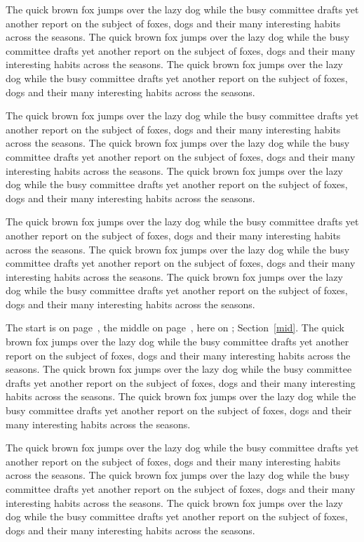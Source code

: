 \documentclass{article}
\begin{document}
The quick brown fox jumps over the lazy dog while the busy committee drafts yet another report on the subject of foxes, dogs and their many interesting habits across the seasons. The quick brown fox jumps over the lazy dog while the busy committee drafts yet another report on the subject of foxes, dogs and their many interesting habits across the seasons. The quick brown fox jumps over the lazy dog while the busy committee drafts yet another report on the subject of foxes, dogs and their many interesting habits across the seasons. 

The quick brown fox jumps over the lazy dog while the busy committee drafts yet another report on the subject of foxes, dogs and their many interesting habits across the seasons. The quick brown fox jumps over the lazy dog while the busy committee drafts yet another report on the subject of foxes, dogs and their many interesting habits across the seasons. The quick brown fox jumps over the lazy dog while the busy committee drafts yet another report on the subject of foxes, dogs and their many interesting habits across the seasons. 

The quick brown fox jumps over the lazy dog while the busy committee drafts yet another report on the subject of foxes, dogs and their many interesting habits across the seasons. The quick brown fox jumps over the lazy dog while the busy committee drafts yet another report on the subject of foxes, dogs and their many interesting habits across the seasons. The quick brown fox jumps over the lazy dog while the busy committee drafts yet another report on the subject of foxes, dogs and their many interesting habits across the seasons. 

The start is on page~\pageref{start}, the middle on page~\pageref{mid}, here on \pageref{here}; Section~\ref{mid}.\label{end}
The quick brown fox jumps over the lazy dog while the busy committee drafts yet another report on the subject of foxes, dogs and their many interesting habits across the seasons. The quick brown fox jumps over the lazy dog while the busy committee drafts yet another report on the subject of foxes, dogs and their many interesting habits across the seasons. The quick brown fox jumps over the lazy dog while the busy committee drafts yet another report on the subject of foxes, dogs and their many interesting habits across the seasons. 

The quick brown fox jumps over the lazy dog while the busy committee drafts yet another report on the subject of foxes, dogs and their many interesting habits across the seasons. The quick brown fox jumps over the lazy dog while the busy committee drafts yet another report on the subject of foxes, dogs and their many interesting habits across the seasons. The quick brown fox jumps over the lazy dog while the busy committee drafts yet another report on the subject of foxes, dogs and their many interesting habits across the seasons. 
\end{document}
